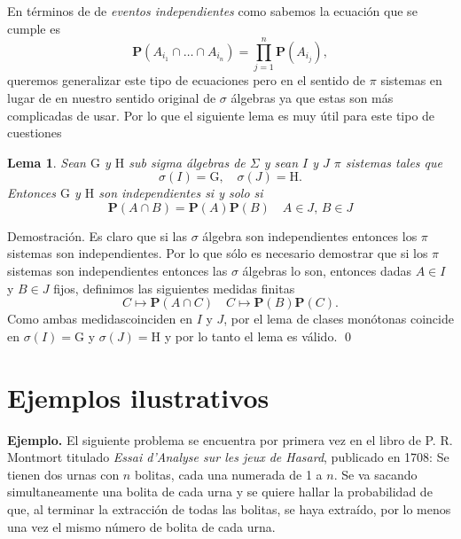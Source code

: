 \documentclass[letterpaper]{book}
\newtheorem{lema}[teorema]{Lema}
\newcommand{\prob}{\textbf{P}}
\newcommand{\exe}{{\newline \noindent \sc \textbf{Ejemplo. }}}
\newcommand{\dem}{{\noindent \sc Demostraci\'on. }}
\newcommand{\sig}{\ensuremath{\Sigma}}
\begin{document}
En términos de de \emph{eventos independientes} como sabemos la ecuación que se cumple es
\[
    \prob(A_{i_1}\cap\dots\cap A_{i_n})=\prod_{j=1}^n\prob(A_{i_j}),
\]
\noindent queremos generalizar este tipo de ecuaciones pero en el sentido de \(\pi\) sistemas en lugar de en nuestro sentido original de \(\sigma\) álgebras ya que estas son más complicadas de usar. Por lo que el siguiente lema es muy útil para este tipo de cuestiones
\begin{lema}\label{sigma_ind}
Sean $\mathrm{G}$ y $\mathrm{H}$ sub sigma álgebras de $\sig$ y sean $I$ y $J$ $\pi$ sistemas tales que
\[
    \sigma(I)=\mathrm{G},\quad\sigma(J)=\mathrm{H}.
\]
Entonces $\mathrm{G}$ y $\mathrm{H}$ son independientes si y solo si
\[
    \prob(A\cap B)=\prob(A)\prob(B)\quad A\in J,\,B\in J
\]
\end{lema}
\dem
Es claro que si las \(\sigma\) álgebra son independientes entonces los \(\pi\) sistemas son independientes. Por lo que sólo es necesario demostrar que si los \(\pi\) sistemas son independientes entonces las \(\sigma\) álgebras lo son, entonces dadas \(A\in I\) y \(B\in J\) fijos, definimos las siguientes medidas finitas
\[
    C\mapsto\prob(A\cap C)\quad C\mapsto\prob(B)\prob(C).
\]
\noindent Como ambas medidascoinciden en \(I\) y \(J\), por el lema de clases monótonas coincide en \(\sigma(I)=\mathrm{G}\) y \(\sigma(J)=\mathrm{H}\) y por lo tanto el lema es válido.
\qed

\section{Ejemplos ilustrativos}
\label{sec:org7beff8a}
\exe El siguiente problema se encuentra por primera vez en el libro de P. R. Montmort titulado \emph{Essai d'Analyse sur les jeux de Hasard}, publicado en 1708: Se tienen dos urnas con \(n\) bolitas, cada una numerada de 1 a \(n\). Se va sacando simultaneamente una bolita de cada urna y se quiere hallar la probabilidad de que, al terminar la extracción de todas las bolitas, se haya extraído, por lo menos una vez el mismo número de bolita de cada urna.
\end{document}
